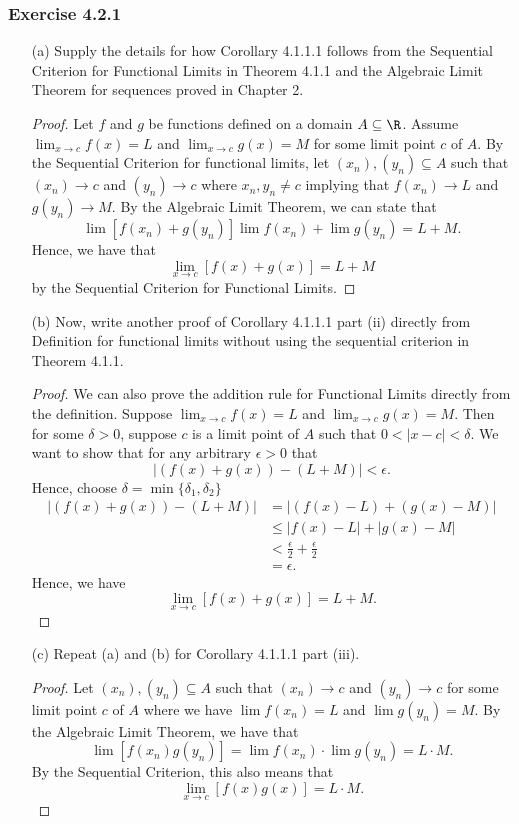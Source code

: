 \subsubsection{Exercise 4.2.1}

\begin{enumerate}
    \item[(a)] Supply the details for how Corollary 4.1.1.1 follows from the Sequential Criterion for Functional Limits in Theorem 4.1.1 and the Algebraic Limit Theorem for sequences proved in Chapter 2.

    \begin{proof}
    Let \( f \) and \( g \) be functions defined on a domain \( A \subseteq \R  \). Assume \( \lim_{ x \to c } f(x) = L  \) and \( \lim_{ x \to c } g(x) = M  \) for some limit point \( c  \) of \( A  \). By the Sequential Criterion for functional limits, let \( (x_n), (y_n) \subseteq A  \) such that \( (x_n) \to c  \) and \( (y_n) \to c  \) where \( x_n, y_n \neq c  \) implying that \(f(x_n) \to L   \) and \( g(y_n) \to M  \). By the Algebraic Limit Theorem, we can state that 
    \[  \lim [f(x_n) + g(y_n)]\lim f(x_n) + \lim g(y_n) = L  + M.\]
    Hence, we have that 
    \[  \lim_{ x \to c } [f(x) + g(x)] = L + M  \]
    by the Sequential Criterion for Functional Limits.
    \end{proof}
    \item[(b)] Now, write another proof of Corollary 4.1.1.1 part (ii) directly from Definition for functional limits without using the sequential criterion in Theorem 4.1.1.
    \begin{proof}
    We can also prove the addition rule for Functional Limits directly from the definition. Suppose \( \lim_{ x \to c } f(x) = L  \) and \( \lim_{ x \to c } g(x) = M  \). Then for some \( \delta > 0  \), suppose \( c  \) is a limit point of \( A  \) such that \( 0 < | x -c  | < \delta \). We want to show that for any arbitrary \( \epsilon > 0  \) that 
    \[  | (f(x) + g(x)) - (L + M) | < \epsilon.  \]
    Hence, choose \( \delta = \min \{ \delta_1, \delta_2  \}  \)
    \begin{align*}
        |(f(x) + g(x)) - (L + M)   | &= | (f(x) - L ) + (g(x) - M ) |  \\
       &\leq  | f(x) - L  |  + | g(x) - M  | \\ 
       &< \frac{ \epsilon  }{ 2  }  + \frac{ \epsilon  }{ 2 } \\
       &= \epsilon.
    \end{align*}
    Hence, we have 
    \[  \lim_{ x \to c } [f(x) + g(x)] = L + M.  \]
    \end{proof}
    \item[(c)] Repeat (a) and (b) for Corollary 4.1.1.1 part (iii).
    \begin{proof}
    Let \( (x_n), (y_n) \subseteq A  \) such that \( (x_n) \to c  \) and \( (y_n) \to c  \) for some limit point \( c  \) of \( A  \) where  we have 
    \( \lim f(x_n) = L   \) and \( \lim  g(y_n) = M  \). By the Algebraic Limit Theorem, we have that 
    \[ \lim [f(x_n)g(y_n)] = \lim f(x_n) \cdot \lim g(y_n) = L \cdot M. \]
   By the Sequential Criterion, this also means that 
   \[  \lim_{ x \to c } [f(x)g(x)] = L \cdot M. \]


\end{proof}
\end{enumerate}
